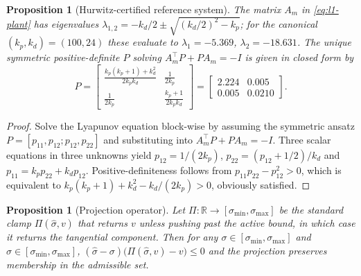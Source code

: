 \documentclass[11pt,a4paper]{article}
\theoremstyle{plain}
\newtheorem{proposition}[theorem]{Proposition}
\theoremstyle{definition}
\begin{document}
\begin{proposition}[Hurwitz-certified reference system]\label{prop:AmHurwitz}
The matrix $A_m$ in \eqref{eq:l1-plant} has eigenvalues
$\lambda_{1,2}=-k_d/2\pm\sqrt{(k_d/2)^2-k_p}$; for the canonical
$(k_p,k_d)=(100,24)$ these evaluate to $\lambda_1=-5.369$,
$\lambda_2=-18.631$. The unique symmetric positive-definite $P$
solving $A_m^\top P + P A_m = -I$ is given in closed form by
\begin{equation}
P = \begin{bmatrix}
    \tfrac{k_p(k_p+1)+k_d^2}{2 k_p k_d} & \tfrac{1}{2 k_p} \\[2pt]
    \tfrac{1}{2 k_p} & \tfrac{k_p + 1}{2 k_p k_d}
\end{bmatrix}
= \begin{bmatrix} 2.224 & 0.005 \\ 0.005 & 0.0210 \end{bmatrix}.
\end{equation}
\end{proposition}

\begin{proof}
Solve the Lyapunov equation block-wise by assuming the symmetric
ansatz $P=[p_{11},p_{12};p_{12},p_{22}]$ and substituting into
$A_m^\top P + P A_m = -I$. Three scalar equations in three unknowns
yield $p_{12}=1/(2k_p)$, $p_{22}=(p_{12}+1/2)/k_d$ and
$p_{11}=k_p p_{22}+k_d p_{12}$. Positive-definiteness follows from
$p_{11}p_{22}-p_{12}^2>0$, which is equivalent to
$k_p(k_p+1)+k_d^2-k_d/(2k_p)>0$, obviously satisfied.
\end{proof}

\begin{proposition}[Projection operator]\label{prop:proj}
Let $\Pi:\mathbb R\to[\sigma_{\min},\sigma_{\max}]$ be the standard
clamp $\Pi(\hat\sigma, v)$ that returns $v$ unless pushing past the
active bound, in which case it returns the tangential component.
Then for any $\sigma\in[\sigma_{\min},\sigma_{\max}]$ and
$\hat\sigma\in[\sigma_{\min},\sigma_{\max}]$,
$(\hat\sigma-\sigma)\bigl(\Pi(\hat\sigma,v)-v\bigr)\le 0$ and the
projection preserves membership in the admissible set.
\end{proposition}
\end{document}
